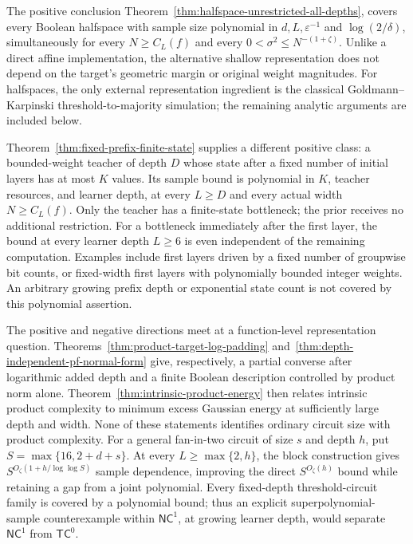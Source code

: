 \documentclass[11pt]{article}
\begin{document}
The positive conclusion
Theorem~\ref{thm:halfspace-unrestricted-all-depths}, covers every Boolean
halfspace with sample size polynomial in $d,L,\varepsilon^{-1}$ and
$\log(2/\delta)$, simultaneously for every $N\ge C_L(f)$ and every
$0<\sigma^2\le N^{-(1+\zeta)}$. Unlike a direct affine implementation,
the alternative shallow representation does not depend on the target's
geometric margin or original weight magnitudes. For halfspaces, the only
external representation ingredient is the classical Goldmann--Karpinski
threshold-to-majority simulation; the remaining analytic arguments are
included below.

Theorem~\ref{thm:fixed-prefix-finite-state} supplies a different
positive class: a bounded-weight teacher of depth $D$ whose state
after a fixed number of initial layers has at most $K$ values.
Its sample bound is polynomial in $K$, teacher resources, and learner
depth, at every $L\ge D$ and every actual width $N\ge C_L(f)$.
Only the teacher has a finite-state bottleneck; the prior receives no
additional restriction. For a bottleneck immediately after the first
layer, the bound at every learner depth $L\ge6$ is even independent of the
remaining computation.
Examples include first layers driven by a fixed number of groupwise
bit counts, or fixed-width first layers with polynomially bounded
integer weights. An arbitrary growing prefix depth or exponential
state count is not covered by this polynomial assertion.

The positive and negative directions meet at a function-level
representation question. Theorems~\ref{thm:product-target-log-padding}
and~\ref{thm:depth-independent-pf-normal-form} give, respectively,
a partial converse after logarithmic added depth and a finite Boolean
description controlled by product norm alone.
Theorem~\ref{thm:intrinsic-product-energy} then relates intrinsic
product complexity to minimum excess Gaussian energy at sufficiently
large depth and width. None of these statements identifies ordinary
circuit size with product complexity. For a general fan-in-two circuit
of size $s$ and depth $h$, put $S=\max\{16,2+d+s\}$. At every
$L\ge\max\{2,h\}$, the block construction gives
$S^{O_\zeta(1+h/\log\log S)}$ sample dependence, improving the direct
$S^{O_\zeta(h)}$ bound while retaining a gap from a joint polynomial.
Every fixed-depth threshold-circuit family is covered by a polynomial
bound; thus an explicit superpolynomial-sample counterexample within
$\mathsf{NC}^1$, at growing learner depth, would separate
$\mathsf{NC}^1$ from $\mathsf{TC}^0$.
\end{document}
